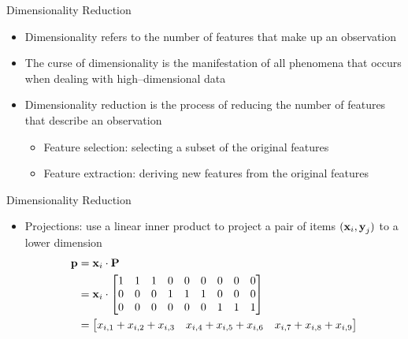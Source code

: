 \begin{frame}{Dimensionality Reduction}
    \begin{itemize}
        \item Dimensionality refers to the number of features that make up an observation
        \item The curse of dimensionality is the manifestation of all phenomena that occurs when dealing with high--dimensional data \cite{article:curse-of-dim}
        \item Dimensionality reduction is the process of reducing the number of features that describe an observation
            \begin{itemize}
                \item Feature selection: selecting a subset of the original features
                \item Feature extraction: deriving new features from the original features
            \end{itemize}
    \end{itemize}
\end{frame}

\begin{frame}{Dimensionality Reduction}
    \begin{itemize}
        \item Projections: use a linear inner product to project a pair of items $(\boldsymbol{\mathbf{x}}_i, \boldsymbol{\mathbf{y}}_j)$ to a lower dimension
        \begin{equation} \label{eq:proj}
            \begin{split}
                \boldsymbol{\mathbf{p}} 
                &= 
                    \boldsymbol{\mathbf{x}}_{i} \cdot \boldsymbol{\mathbf{P}} \\
                &=
                    \boldsymbol{\mathbf{x}}_{i} \cdot
                    \begin{bmatrix}
                        1 & 1 & 1 & 0 & 0 & 0 & 0 & 0 & 0 \\
                        0 & 0 & 0 & 1 & 1 & 1 & 0 & 0 & 0 \\
                        0 & 0 & 0 & 0 & 0 & 0 & 1 & 1 & 1 \\
                    \end{bmatrix} \\  
                &=
                    \begin{bmatrix}
                        x_{i,1} + x_{i,2} + x_{i,3} & x_{i,4} + x_{i,5} + x_{i,6} & x_{i,7} + x_{i,8} + x_{i,9}
                    \end{bmatrix} \\
            \end{split}
        \end{equation}
    \end{itemize}
\end{frame}

